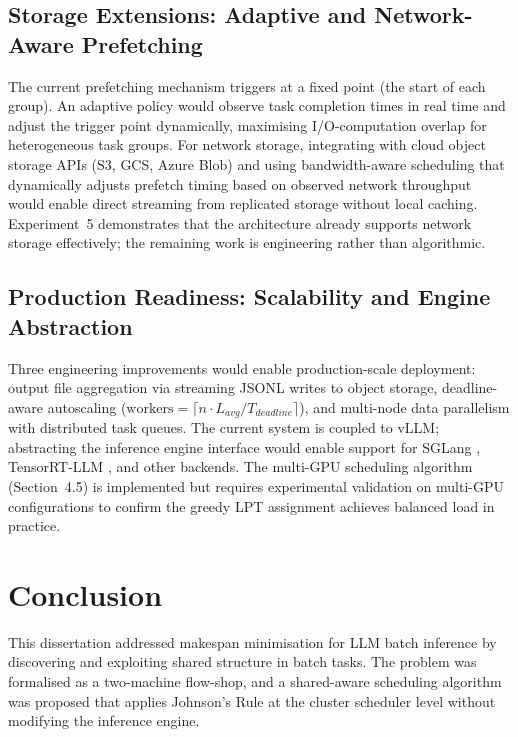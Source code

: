 \documentclass[logo,bsc,singlespacing,parskip,online]{infthesis}
\begin{document}
\section{Storage Extensions: Adaptive and Network-Aware Prefetching}

The current prefetching mechanism triggers at a fixed point (the start of each group). An adaptive policy would observe task completion times in real time and adjust the trigger point dynamically, maximising I/O-computation overlap for heterogeneous task groups. For network storage, integrating with cloud object storage APIs (S3, GCS, Azure Blob) and using bandwidth-aware scheduling that dynamically adjusts prefetch timing based on observed network throughput would enable direct streaming from replicated storage without local caching. Experiment~5 demonstrates that the architecture already supports network storage effectively; the remaining work is engineering rather than algorithmic.

\section{Production Readiness: Scalability and Engine Abstraction}

Three engineering improvements would enable production-scale deployment: output file aggregation via streaming JSONL writes to object storage, deadline-aware autoscaling ($\text{workers} = \lceil n \cdot L_{avg} / T_{deadline} \rceil$), and multi-node data parallelism with distributed task queues. The current system is coupled to vLLM; abstracting the inference engine interface would enable support for SGLang \citep{zheng2024sglang}, TensorRT-LLM \citep{tensorrt_llm2024}, and other backends. The multi-GPU scheduling algorithm (Section~4.5) is implemented but requires experimental validation on multi-GPU configurations to confirm the greedy LPT assignment achieves balanced load in practice.



\chapter{Conclusion}

This dissertation addressed makespan minimisation for LLM batch inference by discovering and exploiting shared structure in batch tasks. The problem was formalised as a two-machine flow-shop, and a shared-aware scheduling algorithm was proposed that applies Johnson's Rule at the cluster scheduler level without modifying the inference engine.
\end{document}
